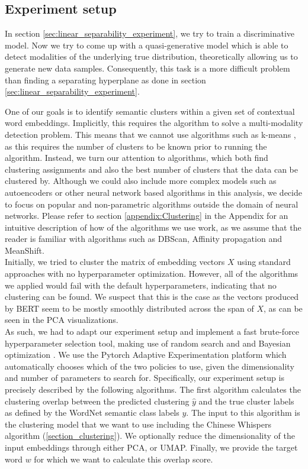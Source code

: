 \documentclass[a4paper,12pt,oneside,openright]{report}
\begin{document}
\subsection{Experiment setup}

In section \ref{sec:linear_separability_experiment}, we try to train a discriminative model.
Now we try to come up with a quasi-generative model which is able to detect modalities of the underlying true distribution, theoretically allowing us to generate new data samples.
Consequently, this task is a more difficult problem than finding a separating hyperplane as done in section \ref{sec:linear_separability_experiment}. 

One of our goals is to identify semantic clusters within a given set of contextual word embeddings.
Implicitly, this requires the algorithm to solve a multi-modality detection problem.
This means that we cannot use algorithms such as k-means \cite{lloyd57, macqueen67}, as this requires the number of clusters to be known prior to running the algorithm.
Instead, we turn our attention to algorithms, which both find clustering assignments and also the best number of clusters that the data can be clustered by.
Although we could also include more complex models such as autoencoders or other neural network based algorithms in this analysis, we decide to focus on popular and non-parametric algorithms outside the domain of neural networks.
Please refer to section \ref{appendix:Clustering} in the Appendix for an intuitive description of how of the algorithms we use work, as we assume that the reader is familiar with algorithms such as DBScan, Affinity propagation and MeanShift. \\

Initially, we tried to cluster the matrix of embedding vectors $X$ using standard approaches with no hyperparameter optimization. 
However, all of the algorithms we applied would fail with the default hyperparameters, indicating that no clustering can be found.
We suspect that this is the case as the vectors produced by BERT seem to be mostly smoothly distributed across the span of $X$, as can be seen in the PCA visualizations. \\

As such, we had to adapt our experiment setup and implement a fast brute-force hyperparameter selection tool, making use of random search and \cite{bergstra12} and Bayesian optimization \cite{wang13}.
We use the Pytorch Adaptive Experimentation platform \cite{pyax} which automatically chooses which of the two policies to use, given the dimensionality and number of parameters to search for.
Specifically, our experiment setup is precisely described by the following algorithms.
The first algorithm calculates the clustering overlap between the predicted clustering $\hat{y}$ and the true cluster labels as defined by the WordNet semantic class labels $y$.
The input to this algorithm is the clustering model that we want to use including the Chinese Whispers algorithm (\ref{section_clustering}). 
We optionally reduce the dimensionality of the input embeddings through either PCA, or UMAP.
Finally, we provide the target word $w$ for which we want to calculate this overlap score.
\end{document}
